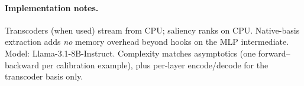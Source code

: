 \paragraph{Implementation notes.}
Transcoders (when used) stream from CPU; saliency ranks on CPU. Native-basis
extraction adds \emph{no} memory overhead beyond hooks on the MLP intermediate.
Model: Llama-3.1-8B-Instruct. Complexity matches \baseline{} asymptotics (one
forward--backward per calibration example), plus per-layer encode/decode for
the transcoder basis only. 
